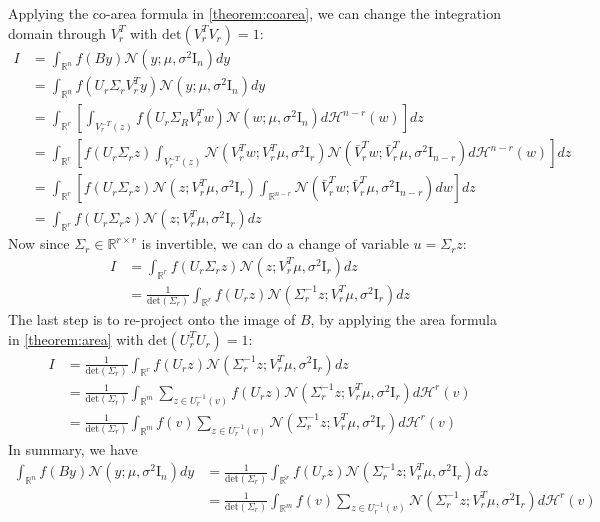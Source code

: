 \documentclass[a4paper,10pt]{article}
\theoremstyle{definition} %
\theoremstyle{definition} %
\theoremstyle{definition} %
\theoremstyle{definition} %
\newcommand{\R}{\mathbb{R}}
\newcommand{\Normal}[1]{\mathcal{N}\left( {#1} \right)}
\newcommand{\Id}{\mathrm{I}}
\newcommand{\0}{\boldsymbol{0}}
\renewcommand{\H}{\mathcal{H}}
\renewcommand{\det}[1]{\mathrm{det}\left( #1 \right)}
\begin{document}
Applying the co-area formula in \cref{theorem:coarea}, we can change the integration domain through $V_r^T$ with $\det{V_r^T V_r} = 1$: 
\begin{align*}
    I &= \int_{\R^n} f(B y) \Normal{y; \mu, \sigma^2 \Id_n} dy 
    \\&= \int_{\R^n} f(U_r \Sigma_r V_r^T y) \Normal{y; \mu, \sigma^2 \Id_n} dy 
    \\&= \int_{\R^r} \left[ \int_{V_r^{-T}(z)} f(U_r \Sigma_R V_r^T w) \Normal{w; \mu, \sigma^2 \Id_n} d\H^{n - r}(w)\right] dz
    \\&= \int_{\R^r} \left[ f(U_r \Sigma_r z) \int_{V_r^{-T}(z)} \Normal{V_r^T w; V_r^T \mu, \sigma^2 \Id_r} \Normal{\bar{V}_r^T w; \bar{V}_r^T \mu, \sigma^2 \Id_{n-r}} d \H^{n - r}(w)\right] dz
    \\&= \int_{\R^r} \left[ f(U_r \Sigma_r z) \Normal{z; V_r^T \mu, \sigma^2 \Id_r} \int_{\R^{n - r}}  \Normal{\bar{V}_r^T w; \bar{V}_r^T \mu, \sigma^2 \Id_{n-r}} dw \right] dz
    \\&= \int_{\R^r}f(U_r \Sigma_r z) \Normal{z; V_r^T \mu, \sigma^2 \Id_r} dz
\end{align*}
Now since $\Sigma_r \in \R^{r \times r}$ is invertible, we can do a change of variable $u = \Sigma_r z$: 
\begin{align*}
    I &= \int_{\R^r}f(U_r \Sigma_r z) \Normal{z; V_r^T \mu, \sigma^2 \Id_r} dz
    \\&= \frac{1}{\det{\Sigma_r}} \int_{\R^r}f(U_r z) \Normal{\Sigma_r^{-1} z; V_r^T \mu, \sigma^2 \Id_r} dz
\end{align*}
The last step is to re-project onto the image of $B$, by applying the area formula in \cref{theorem:area} with $\det{U_r^T U_r} = 1$: 
\begin{align*}
    I &= \frac{1}{\det{\Sigma_r}} \int_{\R^r} f(U_r z) \Normal{\Sigma_r^{-1} z; V_r^T \mu, \sigma^2 \Id_r} dz
    \\&=  \frac{1}{\det{\Sigma_r}} \int_{\R^{m}} \sum_{z \in U_r^{-1}(v) } f(U_r z) \Normal{\Sigma_r^{-1} z; V_r^T \mu, \sigma^2 \Id_r} d \H^{r}(v)
    \\&=  \frac{1}{\det{\Sigma_r}} \int_{\R^{m}} f(v) \sum_{z \in U_r^{-1}(v) } \Normal{\Sigma_r^{-1} z; V_r^T \mu, \sigma^2 \Id_r} d \H^{r}(v)
\end{align*}
In summary, we have 
    \begin{align}\label{eq:key_equation}
        \int_{\R^n} f(B y) \Normal{y; \mu, \sigma^2 \Id_n} dy 
        &= \frac{1}{\det{\Sigma_r}} \int_{\R^r}f(U_r z) \Normal{\Sigma_r^{-1} z; V_r^T \mu, \sigma^2 \Id_r} dz
        \\&= \frac{1}{\det{\Sigma_r}} \int_{\R^{m}} f(v) \sum_{z \in U_r^{-1}(v) } \Normal{\Sigma_r^{-1} z; V_r^T \mu, \sigma^2 \Id_r} d \H^{r}(v)
    \end{align}
\end{document}
